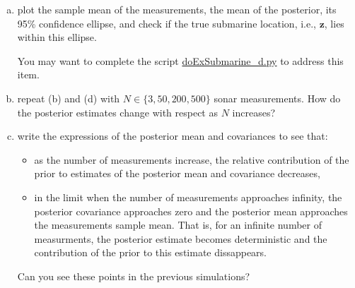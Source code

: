 \documentclass[12pt]{article}
\begin{document}
\begin{enumerate}[(a)]
        \item plot the sample mean of the measurements, the mean of the posterior, its 95\% confidence ellipse, and
            check if the true submarine location, i.e., $\mathbf{z}$, lies
            within this ellipse.

            You may want to complete the script
            \href{http://github.com/joacorapela/gcnu\_bridging2023}{doExSubmarine\_d.py}
            to address this item.

        \item repeat (b) and (d) with $N\in\{3,50,200,500\}$ sonar measurements. How do the
            posterior estimates change with respect as $N$ increases?

        \item write the expressions of the posterior mean and covariances to
            see that:

            \begin{itemize}

                \item as the number of measurements increase, the relative
                    contribution of the prior to estimates of the posterior
                    mean and covariance decreases,

                \item in the limit when the number of measurements approaches
                    infinity, the posterior covariance approaches zero and the
                    posterior mean approaches the measurements sample mean.
                    That is, for an infinite number of measurments, the
                    posterior estimate becomes deterministic and the
                    contribution of the prior to this estimate dissappears.

            \end{itemize}

            Can you see these points in the previous simulations?

    \end{enumerate}
\end{document}
